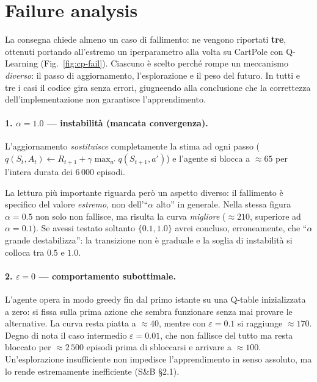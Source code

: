 \section{Failure analysis}
\label{sec:failure}

La consegna chiede almeno un caso di fallimento: ne vengono riportati \textbf{tre},
ottenuti portando all'estremo un iperparametro alla volta su CartPole con
Q\hbox{-}Learning (Fig.~\ref{fig:cp-fail}). Ciascuno \`e scelto perch\'e rompe un
meccanismo \emph{diverso}: il passo di aggiornamento, l'esplorazione e il peso del futuro. 
In tutti e tre i casi il codice gira senza errori, giugneendo alla conclusione che 
la correttezza dell'implementazione non garantisce l'apprendimento.

\paragraph{1. $\alpha = 1.0$ --- instabilit\`a (mancata convergenza).}
L'aggiornamento \emph{sostituisce} completamente la stima ad ogni passo
($q(S_t,A_t) \leftarrow R_{t+1} + \gamma \max_{a'} q(S_{t+1},a')$) e l'agente si blocca a $\approx 65$
per l'intera durata dei 6\,000 episodi.

La lettura pi\`u importante riguarda per\`o un aspetto diverso: il fallimento \`e specifico
del valore \emph{estremo}, non dell'``$\alpha$ alto'' in generale. Nella stessa figura
$\alpha = 0.5$ non solo non fallisce, ma risulta la curva \emph{migliore}
($\approx 210$, superiore ad $\alpha=0.1$). Se avessi testato soltanto $\{0.1, 1.0\}$
avrei concluso, erroneamente, che ``$\alpha$ grande destabilizza'': la transizione non
\`e graduale e la soglia di instabilit\`a si colloca tra $0.5$ e $1.0$.

\paragraph{2. $\varepsilon = 0$ --- comportamento subottimale.}
L'agente opera in modo greedy fin dal primo istante su una Q-table inizializzata a zero:
si fissa sulla prima azione che sembra funzionare senza mai provare le alternative. La
curva resta piatta a $\approx 40$, mentre con $\varepsilon = 0.1$ si raggiunge
$\approx 170$. Degno di nota il caso intermedio $\varepsilon = 0.01$, che non fallisce
del tutto ma resta bloccato per $\approx 2\,500$ episodi prima di sbloccarsi e arrivare
a $\approx 100$. Un'esplorazione insufficiente non impedisce l'apprendimento in senso
assoluto, ma lo rende estremamente inefficiente (S\&B \S2.1).

